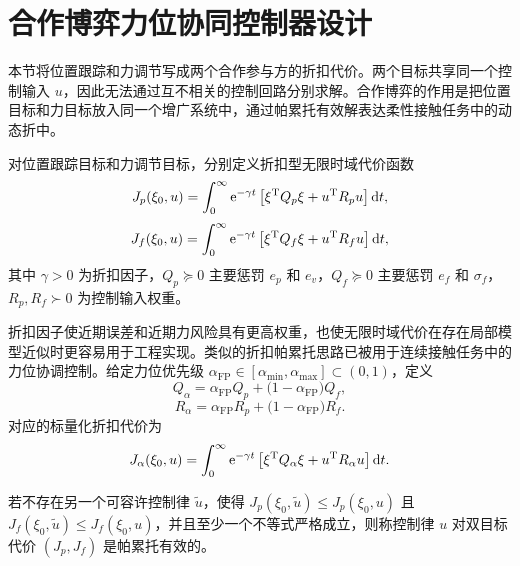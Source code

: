 \section{合作博弈力位协同控制器设计}
\label{sec:ch3_game_controller}

本节将位置跟踪和力调节写成两个合作参与方的折扣代价。两个目标共享同一个控制输入 $u$，因此无法通过互不相关的控制回路分别求解。合作博弈的作用是把位置目标和力目标放入同一个增广系统中，通过帕累托有效解表达柔性接触任务中的动态折中\cite{basar1999dynamic,engwerda2005lqdg}。

\begin{definition}[折扣型位置目标与力目标代价函数]
\label{def:ch3_discount_costs}
对位置跟踪目标和力调节目标，分别定义折扣型无限时域代价函数
\begin{equation}
  J_p(\xi_0,u)=\int_0^\infty \mathrm{e}^{-\gamma t}\left[\xi^{\mathrm{T}}Q_p\xi+u^{\mathrm{T}}R_pu\right]\mathrm{d} t,
  \label{eq:ch3_Jp}
\end{equation}
\begin{equation}
  J_f(\xi_0,u)=\int_0^\infty \mathrm{e}^{-\gamma t}\left[\xi^{\mathrm{T}}Q_f\xi+u^{\mathrm{T}}R_fu\right]\mathrm{d} t,
  \label{eq:ch3_Jf}
\end{equation}
其中 $\gamma>0$ 为折扣因子，$Q_p\succeq0$ 主要惩罚 $e_p$ 和 $e_v$，$Q_f\succeq0$ 主要惩罚 $e_f$ 和 $\sigma_f$，$R_p,R_f\succ0$ 为控制输入权重。
\end{definition}

折扣因子使近期误差和近期力风险具有更高权重，也使无限时域代价在存在局部模型近似时更容易用于工程实现。类似的折扣帕累托思路已被用于连续接触任务中的力位协调控制\cite{li2026pareto}。给定力位优先级 $\alpha_{\mathrm{FP}}\in[\alpha_{\min},\alpha_{\max}]\subset(0,1)$，定义
\begin{equation}
  Q_\alpha=\alpha_{\mathrm{FP}}Q_p+\bigl(1-\alpha_{\mathrm{FP}}\bigr)Q_f,
  \label{eq:ch3_Qalpha}
\end{equation}
\begin{equation}
  R_\alpha=\alpha_{\mathrm{FP}}R_p+\bigl(1-\alpha_{\mathrm{FP}}\bigr)R_f .
  \label{eq:ch3_Ralpha}
\end{equation}
对应的标量化折扣代价为
\begin{equation}
  J_\alpha(\xi_0,u)=\int_0^\infty \mathrm{e}^{-\gamma t}\left[\xi^{\mathrm{T}}Q_\alpha\xi+u^{\mathrm{T}}R_\alpha u\right]\mathrm{d} t .
  \label{eq:ch3_Jalpha}
\end{equation}

\begin{definition}[帕累托有效控制律]
\label{def:ch3_pareto}
若不存在另一个可容许控制律 $\tilde u$，使得 $J_p(\xi_0,\tilde u)\le J_p(\xi_0,u)$ 且 $J_f(\xi_0,\tilde u)\le J_f(\xi_0,u)$，并且至少一个不等式严格成立，则称控制律 $u$ 对双目标代价 $(J_p,J_f)$ 是帕累托有效的。
\end{definition}

